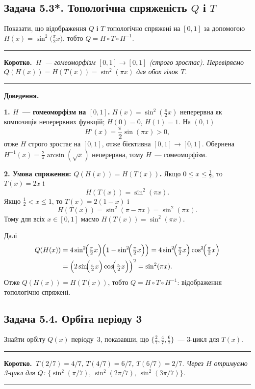 \documentclass[12pt,a4paper]{article}
\newenvironment{korotko}
  {\par\medskip\noindent\begingroup\color{accent!75!black}\rule{\linewidth}{0.4pt}\par
   \noindent\textbf{Коротко.}\itshape\,}
  {\par\noindent\rule{\linewidth}{0.4pt}\endgroup\medskip}
\begin{document}
\subsection{Задача 5.3*. Топологічна спряженість $Q$ і $T$}
Показати, що відображення $Q$ і $T$ топологічно спряжені на $[0,1]$ за
допомогою $H(x)=\sin^2\!\bigl(\tfrac{\pi}{2}x\bigr)$, тобто
$Q=H\circ T\circ H^{-1}$.

\begin{korotko}
$H$~--- гомеоморфізм $[0,1]\to[0,1]$ (строго зростає). Перевіряємо
$Q(H(x))=H(T(x))=\sin^2(\pi x)$ для обох гілок $T$.
\end{korotko}

\noindent\textbf{Доведення.}

\textbf{1. $H$~--- гомеоморфізм на $[0,1]$.}
$H(x)=\sin^2(\tfrac{\pi}{2}x)$ неперервна як композиція неперервних функцій;
$H(0)=0$, $H(1)=1$. На $(0,1)$
\[
  H'(x)=\frac{\pi}{2}\sin(\pi x)>0,
\]
отже $H$ строго зростає на $[0,1]$, отже бієктивна $[0,1]\to[0,1]$.
Обернена $H^{-1}(x)=\tfrac{2}{\pi}\arcsin(\sqrt{x})$ неперервна, тому $H$~---
гомеоморфізм.

\textbf{2. Умова спряження: $Q(H(x))=H(T(x))$.}
Якщо $0\le x\le\tfrac12$, то $T(x)=2x$ і
\[
  H(T(x))=\sin^2(\pi x).
\]
Якщо $\tfrac12<x\le1$, то $T(x)=2(1-x)$ і
\[
  H(T(x))=\sin^2(\pi-\pi x)=\sin^2(\pi x).
\]
Тому для всіх $x\in[0,1]$ маємо $H(T(x))=\sin^2(\pi x)$.

Далі
\begin{align*}
  Q(H(x)) &= 4\sin^2\!\Bigl(\tfrac{\pi}{2}x\Bigr)
            \Bigl(1-\sin^2\!\Bigl(\tfrac{\pi}{2}x\Bigr)\Bigr)
           = 4\sin^2\!\Bigl(\tfrac{\pi}{2}x\Bigr)\cos^2\!\Bigl(\tfrac{\pi}{2}x\Bigr) \\
          &= \Bigl(2\sin\!\Bigl(\tfrac{\pi}{2}x\Bigr)\cos\!\Bigl(\tfrac{\pi}{2}x\Bigr)\Bigr)^2
           = \sin^2(\pi x).
\end{align*}
Отже $Q(H(x))=H(T(x))$, тобто $Q=H\circ T\circ H^{-1}$: відображення
топологічно спряжені.

\subsection{Задача 5.4. Орбіта періоду 3}
Знайти орбіту $Q(x)$ періоду~$3$, показавши, що
$\bigl\{\tfrac27,\tfrac47,\tfrac67\bigr\}$~--- 3-цикл для $T(x)$.

\begin{korotko}
$T(2/7)=4/7$, $T(4/7)=6/7$, $T(6/7)=2/7$. Через $H$ отримуємо 3-цикл для $Q$:
$\{\sin^2(\pi/7),\,\sin^2(2\pi/7),\,\sin^2(3\pi/7)\}$.
\end{korotko}
\end{document}
